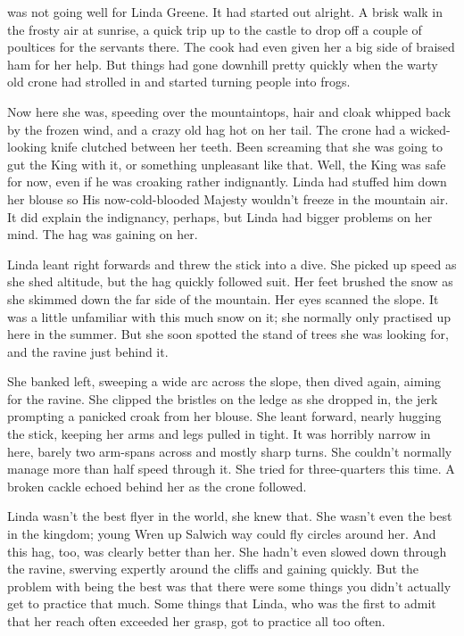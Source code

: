 
 was not going well for Linda Greene.
It had started out alright.
A brisk walk in the frosty air at sunrise, a quick trip up to the castle to drop off a couple of poultices for the servants there.
The cook had even given her a big side of braised ham for her help.
But things had gone downhill pretty quickly when the warty old crone had strolled in and started turning people into frogs.

Now here she was, speeding over the mountaintops, hair and cloak whipped back by the frozen wind, and a crazy old hag hot on her tail.
The crone had a wicked-looking knife clutched between her teeth.
Been screaming that she was going to gut the King with it, or something unpleasant like that.
Well, the King was safe for now, even if he was croaking rather indignantly.
Linda had stuffed him down her blouse so His now-cold-blooded Majesty wouldn't freeze in the mountain air.
It did explain the indignancy, perhaps, but Linda had bigger problems on her mind.
The hag was gaining on her.

Linda leant right forwards and threw the stick into a dive.
She picked up speed as she shed altitude, but the hag quickly followed suit.
Her feet brushed the snow as she skimmed down the far side of the mountain.
Her eyes scanned the slope.
It was a little unfamiliar with this much snow on it; she normally only practised up here in the summer.
But she soon spotted the stand of trees she was looking for, and the ravine just behind it.

She banked left, sweeping a wide arc across the slope, then dived again, aiming for the ravine.
She clipped the bristles on the ledge as she dropped in, the jerk prompting a panicked croak from her blouse.
She leant forward, nearly hugging the stick, keeping her arms and legs pulled in tight.
It was horribly narrow in here, barely two arm-spans across and mostly sharp turns.
She couldn't normally manage more than half speed through it.
She tried for three-quarters this time.
A broken cackle echoed behind her as the crone followed.

Linda wasn't the best flyer in the world, she knew that.
She wasn't even the best in the kingdom; young Wren up Salwich way could fly circles around her.
And this hag, too, was clearly better than her.
She hadn't even slowed down through the ravine, swerving expertly around the cliffs and gaining quickly.
But the problem with being the best was that there were some things you didn't actually get to practice that much.
Some things that Linda, who was the first to admit that her reach often exceeded her grasp, got to practice all too often.

